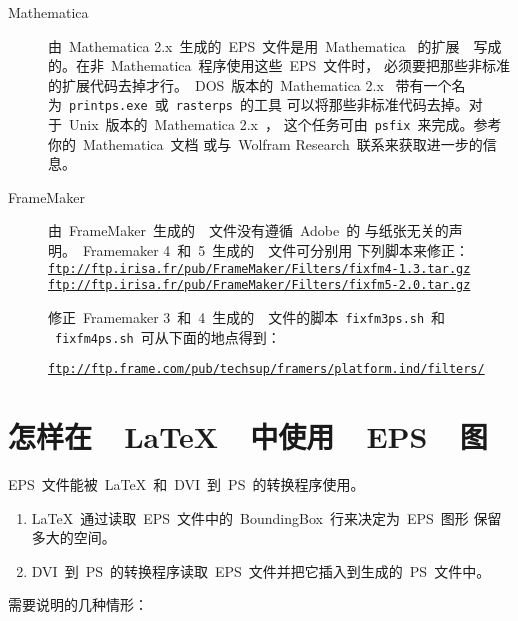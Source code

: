 \begin{description}
	\item [Mathematica] 由~Mathematica 2.x~生成的~EPS~文件是用~Mathematica~
	的扩展~\PS~写成的。在非~Mathematica~程序使用这些~EPS~文件时，
	必须要把那些非标准的扩展代码去掉才行。~DOS~版本的~Mathematica 2.x~
	带有一个名为~\texttt{printps.exe}~或~\texttt{rasterps}~的工具
	可以将那些非标准代码去掉。对于~Unix~版本的~Mathematica 2.x~，
	这个任务可由~\texttt{psfix}~来完成。参考你的~Mathematica~文档
	或与~Wolfram Research~联系来获取进一步的信息。
	\item [FrameMaker] 由~FrameMaker~生成的~\PS~文件没有遵循~Adobe~的
	与纸张无关的声明。~Framemaker 4~和~5~生成的~\PS~文件可分别用
	下列脚本来修正：\\
	\href{ftp://ftp.irisa.fr/pub/FrameMaker/Filters/fixfm4-1.3.tar.gz}%
	{\texttt{ftp://ftp.irisa.fr/pub/FrameMaker/Filters/fixfm4-1.3.tar.gz}}\\
	\href{ftp://ftp.irisa.fr/pub/FrameMaker/Filters/fixfm5-2.0.tar.gz}%
	{\texttt{ftp://ftp.irisa.fr/pub/FrameMaker/Filters/fixfm5-2.0.tar.gz}}
	
	修正~Framemaker 3~和~4~生成的~\PS~文件的脚本~\texttt{fixfm3ps.sh}~和
	~\texttt{fixfm4ps.sh}~可从下面的地点得到：
	
	\href{ftp://ftp.frame.com/pub/techsup/framers/platform.ind/filters/}{\texttt{ftp://ftp.frame.com/pub/techsup/framers/platform.ind/filters/}}
	
\end{description}

\section[怎样在\LaTeX{}中使用~EPS~图]{怎样在~~\LaTeX{}~~中使用~~EPS~~图}\label{sec:useeps}

EPS~文件能被~\LaTeX{}~和~DVI~到~PS~的转换程序使用。

\begin{enumerate}
	\item \LaTeX{}~通过读取~EPS~文件中的~BoundingBox~行来决定为~EPS~图形
	保留多大的空间。
	\item DVI~到~PS~的转换程序读取~EPS~文件并把它插入到生成的~PS~文件中。
\end{enumerate}

需要说明的几种情形：

